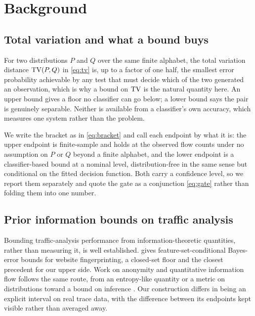 \section{Background}
\label{sec:background}

\subsection{Total variation and what a bound buys}
\label{sec:background/tv}

For two distributions $P$ and $Q$ over the same finite alphabet, the total
variation distance $\mathrm{TV}(P,Q)$ in \eqref{eq:tv} is, up to a factor of one half,
the smallest error probability achievable by any test that must decide which of
the two generated an observation, which is why a bound on $\mathrm{TV}$ is the natural
quantity here. An upper bound gives a floor no classifier can go below; a lower
bound says the pair is genuinely separable. Neither is available from a
classifier's own accuracy, which measures one system rather than the problem.

We write the bracket as in \eqref{eq:bracket} and call each endpoint by what it
is: the upper endpoint is finite-sample and holds at the observed flow counts
under no assumption on $P$ or $Q$ beyond a finite alphabet, and the lower
endpoint is a classifier-based bound at a nominal level, distribution-free in
the same sense but conditional on the fitted decision function. Both carry a
confidence level, so we report them separately and quote the gate as a
conjunction \eqref{eq:gate} rather than folding them into one number.

\subsection{Prior information bounds on traffic analysis}
\label{sec:background/prior}

Bounding traffic-analysis performance from information-theoretic quantities,
rather than measuring it, is well established. \citet{cherubin2017bayes} gives
feature-set-conditional Bayes-error bounds for website fingerprinting, a
closed-set floor and the closest precedent for our upper side. Work on anonymity
and quantitative information flow follows the same route, from an entropy-like
quantity or a metric on distributions toward a bound on inference
\citep{serjantov2003metric,ghaderi2010anonymous,venkitasubramaniam2008eavesdroppers,venkitasubramaniam2008chaum,chatzikokolakis2007error,chatzikokolakis2008noisy}.
Our construction differs in being an explicit interval on real trace data, with
the difference between its endpoints kept visible rather than averaged away.

